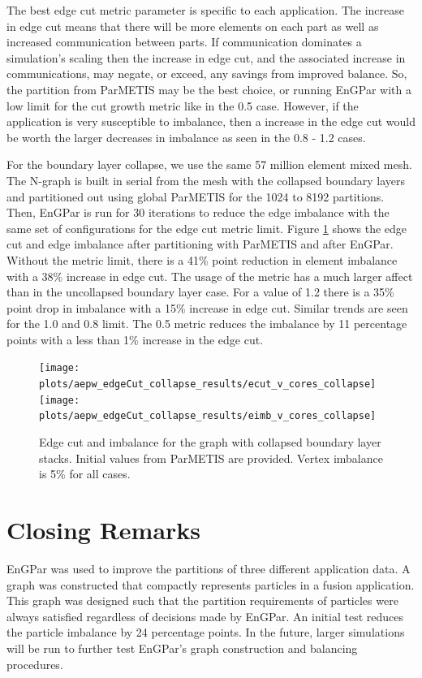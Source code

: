 \documentclass[conference]{IEEEtran}
\begin{document}
The best edge cut metric parameter is specific to each application. The increase in
edge cut means that there will be more elements on each part as well as
increased communication
between parts. If communication dominates a simulation's scaling then the increase in
edge cut, and the associated increase in communications, may negate, or exceed,
any savings from improved balance. So, the partition from ParMETIS may
be the best choice, or running EnGPar with a low limit for the cut growth metric like in the
0.5 case. However, if the application is very susceptible to imbalance, then a increase in the
edge cut would be worth the larger decreases in imbalance as seen in the 0.8 - 1.2 cases.

For the boundary layer collapse, we use the same 57 million element mixed mesh. The N-graph is
built in serial from the mesh with the collapsed boundary layers and partitioned
out using global ParMETIS for the 1024 to 8192 partitions.
Then, EnGPar is run for 30 iterations to reduce the edge imbalance with the same set of
configurations for the edge cut metric limit. Figure \ref{fig:collapse}
shows the edge cut and edge imbalance after partitioning with
ParMETIS and after EnGPar. Without the metric limit, there is a 41\% point reduction in
element imbalance with a 38\% increase in edge cut. The usage of the metric has a much larger
affect than in the uncollapsed boundary layer case. For a value of 1.2 there is a 35\% point
drop in imbalance with a 15\% increase in edge cut. Similar trends are seen for the 1.0 and 0.8
limit. The 0.5 metric reduces the imbalance by 11 percentage points with a less than 1\% increase in the
edge cut.


\begin{figure}[!ht]
  \centering
  \texttt{[image: plots/aepw\_edgeCut\_collapse\_results/ecut\_v\_cores\_collapse]}
  \texttt{[image: plots/aepw\_edgeCut\_collapse\_results/eimb\_v\_cores\_collapse]}
  \caption{Edge cut and imbalance for the graph with collapsed boundary layer stacks. Initial values from ParMETIS are provided. Vertex imbalance is 5\% for all cases.}
  \label{fig:collapse}
\end{figure}

\section{Closing Remarks} \label{sec:closing}


EnGPar was used to improve the partitions of three different application data. A
graph was constructed that compactly represents particles in a fusion application. This
graph was designed such that the partition requirements of particles were always satisfied
regardless of decisions made by EnGPar.
An initial test reduces the particle imbalance by 24 percentage points.
In the future, larger simulations will
be run to further test EnGPar's graph construction and balancing procedures.
\end{document}
